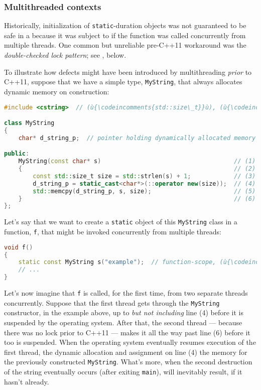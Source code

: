 \subsubsection[Multithreaded contexts]{Multithreaded contexts}\label{multithreaded-contexts}

Historically, initialization of 
\lstinline!static!-duration objects was not guaranteed to be safe in a
 because it was subject to  if the function was called concurrently from multiple threads.
One common but unreliable pre-C++11 workaround was the
\emph{double-checked lock pattern}; see {}, below.

To illustrate how defects might have been introduced by multithreading
\emph{prior} to C++11, suppose that we have a simple type,
\lstinline!MyString!, that always allocates dynamic memory on construction:

\begin{lstlisting}[language=C++]
#include <cstring>  // (ù{\codeincomments{std::size\_t}}ù), (ù{\codeincomments{std::memcpy}}ù), (ù{\codeincomments{std::strlen}}ù)

class MyString
{
    char* d_string_p;  // pointer holding dynamically allocated memory address

public:
    MyString(const char* s)                                     // (1)
    {                                                           // (2)
        const std::size_t size = std::strlen(s) + 1;            // (3)
        d_string_p = static_cast<char*>(::operator new(size));  // (4)
        std::memcpy(d_string_p, s, size);                       // (5)
    }                                                           // (6)
};
\end{lstlisting}
    
\noindent Let's say that we want to create a \lstinline!static! object of this
\lstinline!MyString! class in a function, \lstinline!f!, that might be invoked
concurrently from multiple threads:

\begin{lstlisting}[language=C++]
void f()
{
    static const MyString s("example");  // function-scope, (ù{\codeincomments{static}}ù)-duration
    // ...
}
\end{lstlisting}
    
\noindent Let's now imagine that \lstinline!f! is called, for the first time, from
two separate threads concurrently. Suppose that the first thread gets
through the \lstinline!MyString! constructor, in the example above, up to
\emph{but not including} line (4) before it is suspended by the
operating system. After that, the second thread --- because there was no
lock prior to C++11 --- makes it all the way past line (6) before it too
is suspended. When the operating system eventually resumes execution of
the first thread, the dynamic allocation and assignment on line (4)
 the memory for the previously constructed
\lstinline!MyString!. What's more, when the second destruction of the
string eventually occurs (after exiting \lstinline!main!),
 will inevitably result, if it hasn't
already.

